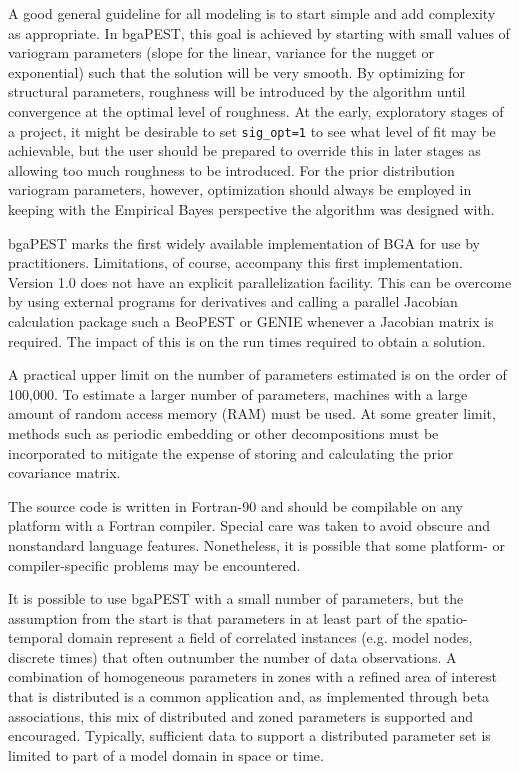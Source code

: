 \documentclass[11pt,oneside,onecolumn]{usgsreport}
\begin{document}
\begin{multicols}{2}
\begin{bibunit}
A good general guideline for all modeling is to start simple and add
complexity as appropriate. In bgaPEST, this goal is achieved by starting
with small values of variogram parameters (slope for the linear, variance
for the nugget or exponential) such that the solution will be very
smooth. By optimizing for structural parameters, roughness will be
introduced by the algorithm until convergence at the optimal level
of roughness. At the early, exploratory stages of a project, it might
be desirable to set \texttt{sig\_opt=1} to see what level of fit may
be achievable, but the user should be prepared to override this in
later stages as allowing too much roughness to be introduced. For
the prior distribution variogram parameters, however, optimization
should always be employed in keeping with the Empirical Bayes perspective
the algorithm was designed with.



bgaPEST marks the first widely available implementation of BGA for
use by practitioners. Limitations, of course, accompany this first
implementation. Version 1.0 does not have an explicit parallelization
facility. This can be overcome by using external programs for derivatives
and calling a parallel Jacobian calculation package such a BeoPEST
\citep{beoPEST} or GENIE \citep{GENIE} whenever a Jacobian matrix
is required. The impact of this is on the run times required to obtain
a solution.

A practical upper limit on the number of parameters estimated is on
the order of 100,000. To estimate a larger number of parameters, machines
with a large amount of random access memory (RAM) must be used. At
some greater limit, methods such as periodic embedding or other decompositions
must be incorporated to mitigate the expense of storing and calculating
the prior covariance matrix.

The source code is written in Fortran-90 and should be compilable
on any platform with a Fortran compiler. Special care was taken to
avoid obscure and nonstandard language features. Nonetheless, it is
possible that some platform- or compiler-specific problems may be
encountered. 

It is possible to use bgaPEST with a small number of parameters, but
the assumption from the start is that parameters in at least part
of the spatio-temporal domain represent a field of correlated instances
(e.g. model nodes, discrete times) that often outnumber the number
of data observations. A combination of homogeneous parameters in zones
with a refined area of interest that is distributed is a common application
and, as implemented through beta associations, this mix of distributed
and zoned parameters is supported and encouraged. Typically, sufficient
data to support a distributed parameter set is limited to part of
a model domain in space or time.


\end{bibunit}
\end{multicols}
\end{document}
